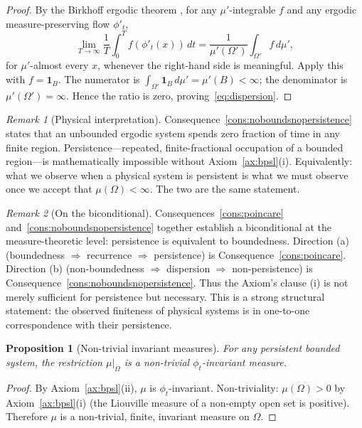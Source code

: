 \documentclass[11pt,twocolumn,a4paper]{article}
\theoremstyle{axiomstyle}
\theoremstyle{conseqstyle}
\newtheorem{proposition}{Proposition}
\theoremstyle{definition}
\theoremstyle{remark}
\newtheorem*{remark}{Remark}
\begin{document}
\begin{proof}
By the Birkhoff ergodic theorem \citep{birkhoff1931,walters1982}, for any $\mu'$-integrable $f$ and any ergodic measure-preserving flow $\phi'_{t}$,
\begin{equation*}
\lim_{T\to\infty}\frac{1}{T}\int_{0}^{T}f(\phi'_{t}(x))\,dt = \frac{1}{\mu'(\Omega')}\int_{\Omega'}f\,d\mu',
\end{equation*}
for $\mu'$-almost every $x$, whenever the right-hand side is meaningful. Apply this with $f=\mathbf{1}_{B}$. The numerator is $\int_{\Omega'}\mathbf{1}_{B}\,d\mu'=\mu'(B)<\infty$; the denominator is $\mu'(\Omega')=\infty$. Hence the ratio is zero, proving~\eqref{eq:dispersion}.
\end{proof}

\begin{remark}[Physical interpretation]
Consequence~\ref{cons:noboundsnopersistence} states that an unbounded ergodic system spends zero fraction of time in any finite region. Persistence---repeated, finite-fractional occupation of a bounded region---is mathematically impossible without Axiom~\ref{ax:bpsl}(i). Equivalently: what we observe when a physical system is persistent is what we must observe once we accept that $\mu(\Omega)<\infty$. The two are the same statement.
\end{remark}

\begin{remark}[On the biconditional]
Consequences~\ref{cons:poincare} and~\ref{cons:noboundsnopersistence} together establish a biconditional at the measure-theoretic level: persistence is equivalent to boundedness. Direction (a) (boundedness $\Rightarrow$ recurrence $\Rightarrow$ persistence) is Consequence~\ref{cons:poincare}. Direction (b) (non-boundedness $\Rightarrow$ dispersion $\Rightarrow$ non-persistence) is Consequence~\ref{cons:noboundsnopersistence}. Thus the Axiom's clause (i) is not merely sufficient for persistence but necessary. This is a strong structural statement: the observed finiteness of physical systems is in one-to-one correspondence with their persistence.
\end{remark}

\begin{proposition}[Non-trivial invariant measures]
\label{prop:nontriv}
For any persistent bounded system, the restriction $\mu|_{\Omega}$ is a non-trivial $\phi_{t}$-invariant measure.
\end{proposition}

\begin{proof}
By Axiom~\ref{ax:bpsl}(ii), $\mu$ is $\phi_{t}$-invariant. Non-triviality: $\mu(\Omega)>0$ by Axiom~\ref{ax:bpsl}(i) (the Liouville measure of a non-empty open set is positive). Therefore $\mu$ is a non-trivial, finite, invariant measure on $\Omega$.
\end{proof}
\end{document}
